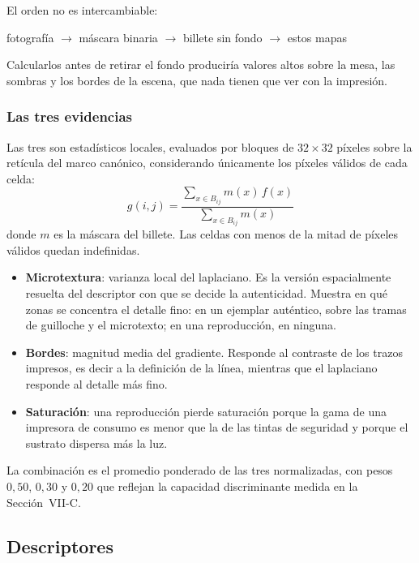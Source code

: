 \documentclass[conference]{IEEEtran}
\begin{document}
El orden no es intercambiable:
\begin{center}
fotografía $\rightarrow$ máscara binaria $\rightarrow$ billete sin
fondo $\rightarrow$ estos mapas
\end{center}
Calcularlos antes de retirar el fondo produciría valores altos sobre
la mesa, las sombras y los bordes de la escena, que nada tienen que
ver con la impresión.

\subsubsection{Las tres evidencias}
Las tres son estadísticos locales, evaluados por bloques de
$32\times32$ píxeles sobre la retícula del marco canónico,
considerando únicamente los píxeles válidos de cada celda:
\begin{equation}
g(i,j) = \frac{\sum_{x\in B_{ij}} m(x)\,f(x)}
              {\sum_{x\in B_{ij}} m(x)}
\end{equation}
donde $m$ es la máscara del billete. Las celdas con menos de la mitad
de píxeles válidos quedan indefinidas.

\begin{itemize}
\item \textbf{Microtextura}: varianza local del laplaciano. Es la
      versión espacialmente resuelta del descriptor con que se decide
      la autenticidad. Muestra en qué zonas se concentra el detalle
      fino: en un ejemplar auténtico, sobre las tramas de guilloche y
      el microtexto; en una reproducción, en ninguna.
\item \textbf{Bordes}: magnitud media del gradiente. Responde al
      contraste de los trazos impresos, es decir a la definición de la
      línea, mientras que el laplaciano responde al detalle más fino.
\item \textbf{Saturación}: una reproducción pierde saturación porque
      la gama de una impresora de consumo es menor que la de las
      tintas de seguridad y porque el sustrato dispersa más la luz.
\end{itemize}

La combinación es el promedio ponderado de las tres normalizadas, con
pesos $0{,}50$, $0{,}30$ y $0{,}20$ que reflejan la capacidad
discriminante medida en la Sección~VII-C.

\subsection{Descriptores}
\end{document}
